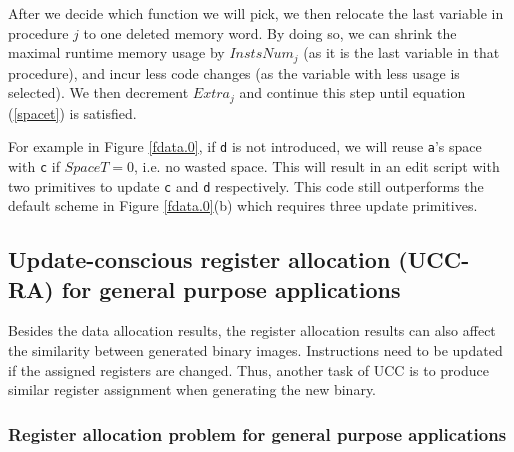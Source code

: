 After we decide which function we will pick, we then relocate the last 
variable in procedure $j$ to one
deleted memory word. By doing so, we can shrink the maximal runtime
memory usage by $InstsNum_j$ (as it is the last variable in that
procedure), and incur less code changes (as the variable with less
usage is selected). We then decrement $Extra_j$ and continue this step
until equation (\ref{spacet}) is satisfied.

For example in Figure \ref{fdata.0}, if {\tt d} is not introduced, we
will reuse {\tt a}'s space with {\tt c} if $SpaceT=0$, i.e. no wasted
space. This will result in an edit script with two primitives to
update {\tt c} and {\tt d} respectively. This code still outperforms
the default scheme in Figure \ref{fdata.0}(b) which requires three
update primitives.



\subsection{Update-conscious register allocation (UCC-RA) for general purpose applications}
Besides the data allocation results, the register allocation results can also 
affect the similarity between generated binary images.
Instructions need to be updated if the assigned registers are changed.
Thus, another task of UCC is to produce similar register assignment
when generating the new binary.

\subsubsection{Register allocation problem for general purpose applications} 
%

